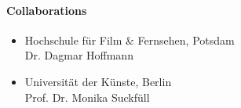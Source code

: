 \paragraph{Collaborations}
\begin{itemize}
\item Hochschule f\"{u}r Film \& Fernsehen, Potsdam \\ Dr. Dagmar Hoffmann
\item Universit\"{a}t der K\"{u}nste, Berlin \\ Prof. Dr. Monika Suckf\"{u}ll 
\end{itemize}

\begin{bibunit}[apalike]
\nocite{*}
\putbib[profClemensSchwender4]
\end{bibunit}
